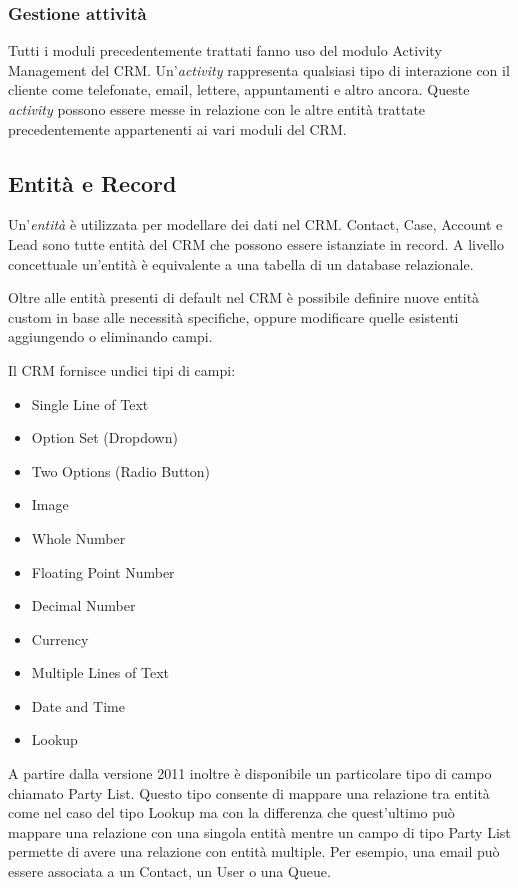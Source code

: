 \subsubsection{Gestione attività}
\label{sssec:gestione-attivita}
Tutti i moduli precedentemente trattati fanno uso del modulo Activity Management del CRM. Un'\textit{activity} rappresenta qualsiasi tipo di interazione con il cliente come telefonate, email, lettere, appuntamenti e altro ancora. Queste \textit{activity} possono essere messe in relazione con le altre entità trattate precedentemente appartenenti ai vari moduli del CRM.

\subsection{Entità e Record}
Un'\textit{entità} è utilizzata per modellare dei dati nel CRM. Contact, Case, Account e Lead sono tutte entità del CRM che possono essere istanziate in record. A livello concettuale un'entità è equivalente a una tabella di un database relazionale.

Oltre alle entità presenti di default nel CRM è possibile definire nuove entità custom in base alle necessità specifiche, oppure modificare quelle esistenti aggiungendo o eliminando campi.

Il CRM fornisce undici tipi di campi:
\begin{itemize}
  \item Single Line of Text
  \item Option Set (Dropdown)
  \item Two Options (Radio Button)
  \item Image
  \item Whole Number
  \item Floating Point Number
  \item Decimal Number
  \item Currency
  \item Multiple Lines of Text
  \item Date and Time
  \item Lookup
\end{itemize} 

A partire dalla versione 2011 inoltre è disponibile un particolare tipo di campo chiamato Party List. Questo tipo consente di mappare una relazione tra entità come nel caso del tipo Lookup ma con la differenza che quest'ultimo può mappare una relazione con una singola entità mentre un campo di tipo Party List permette di avere una relazione con entità multiple. Per esempio, una email può essere associata a un Contact, un User o una Queue.~\cite{DynamicsTutorialspoint}

